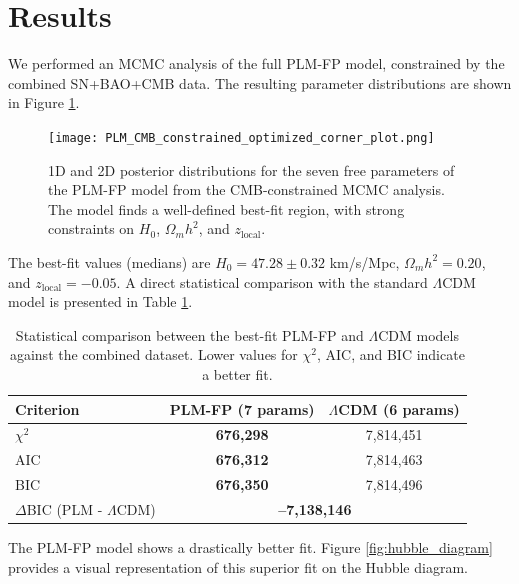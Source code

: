 \documentclass[12pt, a4paper]{article}
\begin{document}
\section{Results}
We performed an MCMC analysis of the full PLM-FP model, constrained by the combined SN+BAO+CMB data. The resulting parameter distributions are shown in Figure \ref{fig:corner_plot}.

\begin{figure}[H]
    \centering
    \texttt{[image: PLM\_CMB\_constrained\_optimized\_corner\_plot.png]}
    \caption{1D and 2D posterior distributions for the seven free parameters of the PLM-FP model from the CMB-constrained MCMC analysis. The model finds a well-defined best-fit region, with strong constraints on $H_0$, $\Omega_m h^2$, and $z_{\text{local}}$.}
    \label{fig:corner_plot}
\end{figure}

The best-fit values (medians) are $H_0 = 47.28 \pm 0.32$ km/s/Mpc, $\Omega_m h^2 = 0.20$, and $z_{\text{local}} = -0.05$. A direct statistical comparison with the standard $\Lambda$CDM model is presented in Table \ref{tab:comparison}.

\begin{table}[H]
    \centering
    \caption{Statistical comparison between the best-fit PLM-FP and $\Lambda$CDM models against the combined dataset. Lower values for $\chi^2$, AIC, and BIC indicate a better fit.}
    \begin{tabular}{lcc}
        \hline
        \textbf{Criterion} & \textbf{PLM-FP (7 params)} & \textbf{$\Lambda$CDM (6 params)} \\
        \hline
        $\chi^2$ & \textbf{676,298} & 7,814,451 \\
        AIC & \textbf{676,312} & 7,814,463 \\
        BIC & \textbf{676,350} & 7,814,496 \\
        $\Delta$BIC (PLM - $\Lambda$CDM) & \multicolumn{2}{c}{\textbf{--7,138,146}} \\
        \hline
    \end{tabular}
    \label{tab:comparison}
\end{table}

The PLM-FP model shows a drastically better fit. Figure \ref{fig:hubble_diagram} provides a visual representation of this superior fit on the Hubble diagram.
\end{document}

